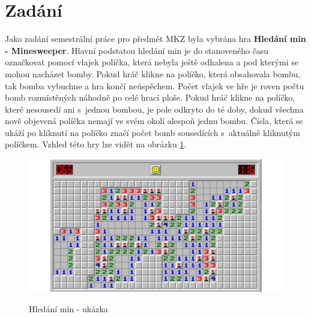\documentclass[12pt, a4paper]{article}
\begin{document}
\section{Zadání}
Jako zadání semestrální práce pro předmět MKZ byla vybrána hra \textbf{Hledání min - Minesweeper}. Hlavní podstatou hledání min je do stanoveného času označkovat pomocí vlajek políčka, která nebyla ještě odhalena a pod kterými se mohou nacházet bomby. Pokud hráč klikne na políčko, která obsahovala bombu, tak bomba vybuchne a hra končí neúspěchem. Počet vlajek ve hře je roven počtu bomb rozmístěných náhodně po celé hrací ploše. Pokud hráč klikne na políčko, které nesousedí ani s~jednou bombou, je pole odkryto do té doby, dokud všechna nově objevená políčka nemají ve svém okolí alespoň jednu bombu. Čísla, která se ukáží po kliknutí na políčko značí počet bomb sousedících s~aktuálně kliknutým políčkem. Vzhled této hry lze vidět na obrázku \ref{fig:uvod_obrazek}.
	\begin{figure}[h!]
	\centering
	\includegraphics[width=14cm]{img/uvod_obrazek}\\
	\caption{Hledání min - ukázka}
	\label{fig:uvod_obrazek}
	\end{figure}
\newpage
\end{document}
